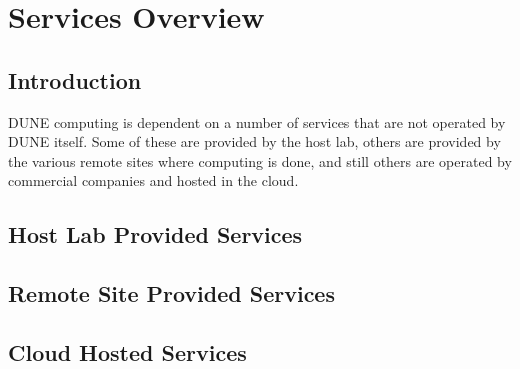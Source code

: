\chapter{Services Overview }
\label{ch:serv}

\section{Introduction}
DUNE computing is dependent on a number of services that are not operated by DUNE itself.
Some of these are provided by the host lab, others are provided by the various remote sites where
computing is done, and still others are operated by commercial companies and hosted in the cloud.

\section{Host Lab Provided Services}
\section{Remote Site Provided Services}
\section{Cloud Hosted Services}


